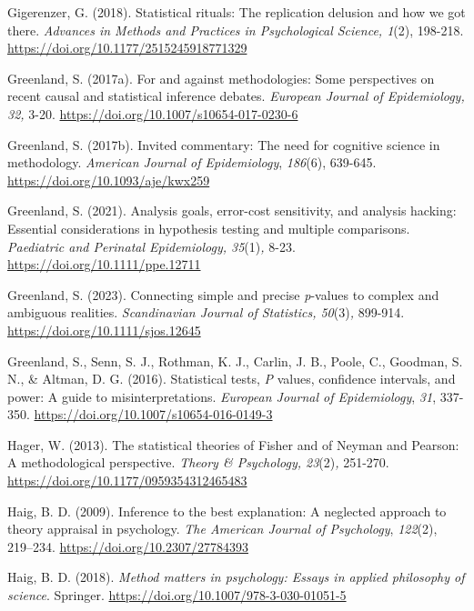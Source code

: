 \documentclass[authordate, meta]{jote-new-article}
\begin{document}
	Gigerenzer, G. (2018). Statistical rituals: The replication delusion and how we got there. \emph{Advances in Methods and Practices in Psychological Science, 1}(2), 198-218. \url{https://doi.org/10.1177/2515245918771329}



	Greenland, S. (2017a). For and against methodologies: Some perspectives on recent causal and statistical inference debates. \emph{European Journal of Epidemiology, 32,} 3-20. \url{https://doi.org/10.1007/s10654-017-0230-6}



	Greenland, S. (2017b). Invited commentary: The need for cognitive science in methodology. \emph{American Journal of Epidemiology}, \emph{186}(6), 639-645. \url{https://doi.org/10.1093/aje/kwx259}



	Greenland, S. (2021). Analysis goals, error-cost sensitivity, and analysis hacking: Essential considerations in hypothesis testing and multiple comparisons. \emph{Paediatric and Perinatal Epidemiology, 35}(1)\emph{, }8-23. \url{https://doi.org/10.1111/ppe.12711}



	Greenland, S. (2023). Connecting simple and precise \emph{p}-values to complex and ambiguous realities. \emph{Scandinavian Journal of Statistics, 50}(3)\emph{,} 899-914. \url{https://doi.org/10.1111/sjos.12645}



	Greenland, S., Senn, S. J., Rothman, K. J., Carlin, J. B., Poole, C., Goodman, S. N., \& Altman, D. G. (2016). Statistical tests, \emph{P} values, confidence intervals, and power: A guide to misinterpretations. \emph{European Journal of Epidemiology}, \emph{31}, 337-350. \url{https://doi.org/10.1007/s10654-016-0149-3}



	Hager, W. (2013). The statistical theories of Fisher and of Neyman and Pearson: A methodological perspective. \emph{Theory \& Psychology, 23}(2)\emph{,} 251-270. \url{https://doi.org/10.1177/0959354312465483}



	Haig, B. D. (2009). Inference to the best explanation: A neglected approach to theory appraisal in psychology. \emph{The American Journal of Psychology}, \emph{122}(2), 219--234. \url{https://doi.org/10.2307/27784393}



	Haig, B. D. (2018). \emph{Method matters in psychology: Essays in applied philosophy of science}. Springer. \url{https://doi.org/10.1007/978-3-030-01051-5}
\end{document}
